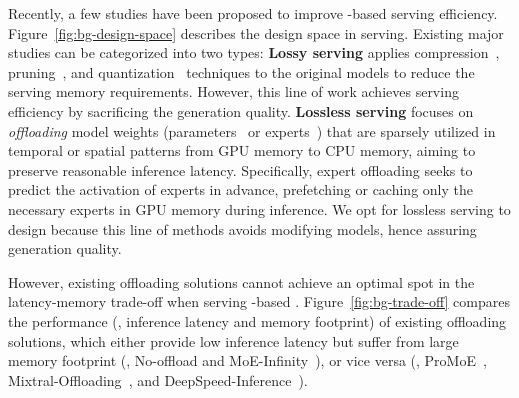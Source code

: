 Recently, a few studies have been proposed to improve \MoE-based \LLM serving efficiency.
Figure~\ref{fig:bg-design-space} describes the design space in \MoE serving.
%
% 
Existing major studies can be categorized into two types: 
%
\textbf{Lossy serving} applies compression~\cite{li2023merge}, pruning~\cite{lee2024stun}, and quantization~\cite{kim2023mixture} techniques to the original \MoE models to reduce the serving memory requirements. However, this line of work achieves serving efficiency by sacrificing the generation quality. 
%
\textbf{Lossless serving} focuses on \textit{offloading} model weights (parameters~\cite{aminabadi2022deepspeed,ollama} or experts~\cite{eliseev2023fast,song2024promoe,xue2024moe}) that are sparsely utilized in temporal or spatial patterns from GPU memory to CPU memory, aiming to preserve reasonable inference latency. 
%
Specifically, expert offloading seeks to predict the activation of experts in advance, prefetching or caching only the necessary experts in GPU memory during inference.
%
We opt for lossless serving to design \sys because this line of methods avoids modifying models, hence assuring generation quality. 

However, existing offloading solutions cannot achieve an optimal spot in the latency-memory trade-off when serving \MoE-based \LLMs. 
Figure~\ref{fig:bg-trade-off} compares the performance (\ie, inference latency and memory footprint) of existing \SOTA offloading solutions, which either provide low inference latency but suffer from large memory footprint (\eg, No-offload and MoE-Infinity~\cite{xue2024moe}), or vice versa (\eg, ProMoE~\cite{song2024promoe}, Mixtral-Offloading~\cite{eliseev2023fast}, and DeepSpeed-Inference~\cite{aminabadi2022deepspeed}). 

